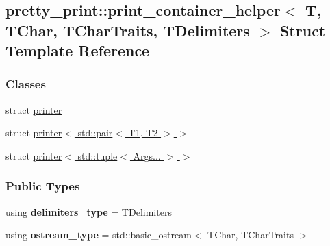 \hypertarget{structpretty__print_1_1print__container__helper}{}\subsection{pretty\+\_\+print\+:\+:print\+\_\+container\+\_\+helper$<$ T, T\+Char, T\+Char\+Traits, T\+Delimiters $>$ Struct Template Reference}
\label{structpretty__print_1_1print__container__helper}
\subsubsection*{Classes}
\begin{DoxyCompactItemize}
\item 
struct \hyperlink{structpretty__print_1_1print__container__helper_1_1printer}{printer}
\item 
struct \hyperlink{structpretty__print_1_1print__container__helper_1_1printer_3_01std_1_1pair_3_01T1_00_01T2_01_4_01_4}{printer$<$ std\+::pair$<$ T1, T2 $>$ $>$}
\item 
struct \hyperlink{structpretty__print_1_1print__container__helper_1_1printer_3_01std_1_1tuple_3_01Args_8_8_8_01_4_01_4}{printer$<$ std\+::tuple$<$ Args... $>$ $>$}
\end{DoxyCompactItemize}
\subsubsection*{Public Types}
\begin{DoxyCompactItemize}
\item 
using {\bfseries delimiters\+\_\+type} = T\+Delimiters\hypertarget{structpretty__print_1_1print__container__helper_ab89ba042f7c5060139249214808dfe6a}{}\label{structpretty__print_1_1print__container__helper_ab89ba042f7c5060139249214808dfe6a}

\item 
using {\bfseries ostream\+\_\+type} = std\+::basic\+\_\+ostream$<$ T\+Char, T\+Char\+Traits $>$\hypertarget{structpretty__print_1_1print__container__helper_a83d1975debeabc20949606fcae5a5701}{}\label{structpretty__print_1_1print__container__helper_a83d1975debeabc20949606fcae5a5701}

\end{DoxyCompactItemize}
